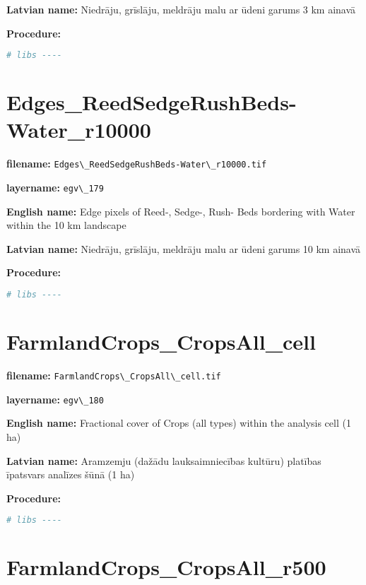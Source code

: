 \documentclass[
]{book}
\newcommand{\passthrough}[1]{#1}
\begin{document}
\textbf{Latvian name:} Niedrāju, grīslāju, meldrāju malu ar ūdeni garums 3 km ainavā

\textbf{Procedure:}

\begin{lstlisting}[language=R]
# libs ----
\end{lstlisting}

\section{Edges\_ReedSedgeRushBeds-Water\_r10000}\label{ch06.179}

\textbf{filename:} \passthrough{\lstinline!Edges\_ReedSedgeRushBeds-Water\_r10000.tif!}

\textbf{layername:} \passthrough{\lstinline!egv\_179!}

\textbf{English name:} Edge pixels of Reed-, Sedge-, Rush- Beds bordering with Water within the 10 km landscape

\textbf{Latvian name:} Niedrāju, grīslāju, meldrāju malu ar ūdeni garums 10 km ainavā

\textbf{Procedure:}

\begin{lstlisting}[language=R]
# libs ----
\end{lstlisting}

\section{FarmlandCrops\_CropsAll\_cell}\label{ch06.180}

\textbf{filename:} \passthrough{\lstinline!FarmlandCrops\_CropsAll\_cell.tif!}

\textbf{layername:} \passthrough{\lstinline!egv\_180!}

\textbf{English name:} Fractional cover of Crops (all types) within the analysis cell (1 ha)

\textbf{Latvian name:} Aramzemju (dažādu lauksaimniecības kultūru) platības īpatsvars analīzes šūnā (1 ha)

\textbf{Procedure:}

\begin{lstlisting}[language=R]
# libs ----
\end{lstlisting}

\section{FarmlandCrops\_CropsAll\_r500}\label{ch06.181}
\end{document}
